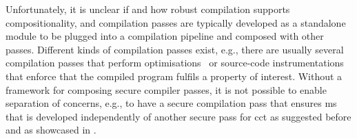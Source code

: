 \documentclass[utf8,acmsmall,review,screen,dvipsnames,anonymous]{acmart}
\begin{document}
Unfortunately, it is unclear if and how robust compilation supports compositionality, and compilation passes are typically developed as a standalone module to be plugged into a compilation pipeline and composed with other passes.
Different kinds of compilation passes exist, e.g., there are usually several compilation passes that perform optimisations~\cite{lattner2004llvm,googlev8,androidstudio,kuepper2023cryptopt,manjikian1997fusion,wegman1991ccp} or source-code instrumentations~\cite{nagarakatte2009soft,nagarakatte2010cets,akritidis2009baggy,dhumbumroong2020boundwarden,jung2021pico,nam2019framer,shankaranarayana2023tailcheck,younan2010paricheck,zhou2023fatptrs,bond2017vale,almeida2017jasmin,kuepper2023cryptopt,cauligi2019fact} that enforce that the compiled program fulfils a property of interest.
Without a framework for composing secure compiler passes, it is not possible to enable separation of concerns, e.g., to have a secure compilation pass that ensures \gls{ms} that is developed independently of another secure pass for \gls{cct} as suggested before and as showcased in .
\end{document}
